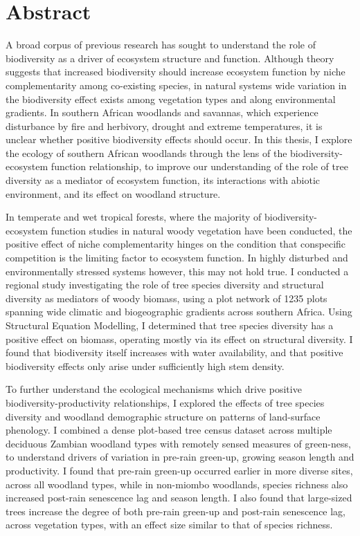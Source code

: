 \chapter*{Abstract}

\label{abstract}

A broad corpus of previous research has sought to understand the role of biodiversity as a driver of ecosystem structure and function. Although theory suggests that increased biodiversity should increase ecosystem function by niche complementarity among co-existing species, in natural systems wide variation in the biodiversity effect exists among vegetation types and along environmental gradients. In southern African woodlands and savannas, which experience disturbance by fire and herbivory, drought and extreme temperatures, it is unclear whether positive biodiversity effects should occur. In this thesis, I explore the ecology of southern African woodlands through the lens of the biodiversity-ecosystem function relationship, to improve our understanding of the role of tree diversity as a mediator of ecosystem function, its interactions with abiotic environment, and its effect on woodland structure. 

In temperate and wet tropical forests, where the majority of biodiversity-ecosystem function studies in natural woody vegetation have been conducted, the positive effect of niche complementarity hinges on the condition that conspecific competition is the limiting factor to ecosystem function. In highly disturbed and environmentally stressed systems however, this may not hold true. I conducted a regional study investigating the role of tree species diversity and structural diversity as mediators of woody biomass, using a plot network of 1235 plots spanning wide climatic and biogeographic gradients across southern Africa. Using Structural Equation Modelling, I determined that tree species diversity has a positive effect on biomass, operating mostly via its effect on structural diversity. I found that biodiversity itself increases with water availability, and that positive biodiversity effects only arise under sufficiently high stem density.

To further understand the ecological mechanisms which drive positive biodiversity-productivity relationships, I explored the effects of tree species diversity and woodland demographic structure on patterns of land-surface phenology. I combined a dense plot-based tree census dataset across multiple deciduous Zambian woodland types with remotely sensed measures of green-ness, to understand drivers of variation in pre-rain green-up, growing season length and productivity. I found that pre-rain green-up occurred earlier in more diverse sites, across all woodland types, while in non-miombo woodlands, species richness also increased post-rain senescence lag and season length. I also found that large-sized trees increase the degree of both pre-rain green-up and post-rain senescence lag, across vegetation types, with an effect size similar to that of species richness.

